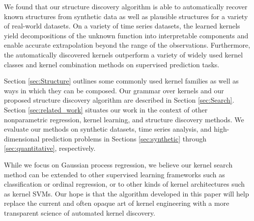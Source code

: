 \documentclass[twoside]{article}
\begin{document}
We found that our structure discovery algorithm is able to automatically recover known structures from synthetic data as well as plausible structures for a variety of real-world datasets. 
On a variety of time series datasets, the learned kernels yield decompositions of the unknown function into interpretable components and enable accurate extrapolation beyond the range of the observations.
Furthermore, the automatically discovered kernels outperform a variety of widely used kernel classes and kernel combination methods on supervised prediction tasks.

Section \ref{sec:Structure} outlines some commonly used kernel families as well as ways in which they can be composed. 
Our grammar over kernels and our proposed structure discovery algorithm are described in Section \ref{sec:Search}. 
Section \ref{sec:related_work} situates our work in the context of other nonparametric regression, kernel learning, and structure discovery methods.
We evaluate our methods on synthetic datasets, time series analysis, and high-dimensional prediction problems in Sections \ref{sec:synthetic} through \ref{sec:quantitative}, respectively.

While we focus on Gaussian process regression, we believe our kernel search method can be extended to other supervised learning frameworks such as classification or ordinal regression, or to other kinds of kernel architectures such as kernel SVMs.
Our hope is that the algorithm developed in this paper will help replace the current and often opaque art of kernel engineering with a more transparent science of automated kernel discovery.


\end{document}
